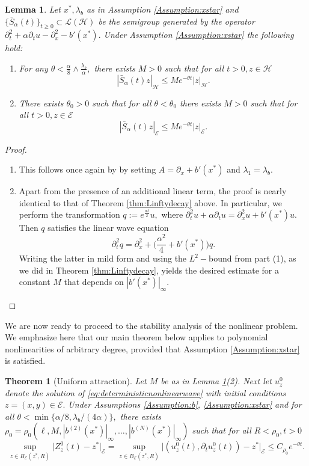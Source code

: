 \documentclass[10pt, reqno]{amsart}
\newcommand{\h}{\mathcal{H}}
\newcommand{\e}{\mathcal{E}}
\newtheorem{lem}{Lemma}
\newtheorem{thm}{Theorem}
\theoremstyle{definition}
\numberwithin{lem}{section}
\numberwithin{cor}{section}
\numberwithin{prop}{section}
\numberwithin{thm}{section}
\numberwithin{dfn}{section}
\begin{document}
\begin{lem}\label{lem:linearizedsemigroup} Let $x^*, \lambda_b$ as in Assumption \ref{Assumption:xstar} and $\{\bar{S}_\alpha(t)\}_{t\geq 0}\subset \mathscr{L}(\h)$ be the semigroup generated by the operator $\partial_t^2+\alpha\partial_tu-\partial_x^2-b'(x^*).$ Under Assumption \ref{Assumption:xstar} the following hold:
\begin{enumerate}
    \item For any $\theta<\tfrac{\alpha}{8}\wedge\tfrac{\lambda_b}{\alpha},$ there exists $M>0$ such that for all $t>0, z\in\h$
$$ |\bar{S}_\alpha(t)z|_{\h}\leq Me^{-\theta t}|z|_{\h}.      $$
\item There exists $\theta_0>0$ such that for all $\theta<\theta_0$ there exists $M>0$  such that for all $t>0, z\in\e$
$$ |\bar{S}_\alpha(t)z|_{\e}\leq Me^{-\theta t}|z|_{\e}.      $$
\end{enumerate}    
\end{lem}

\begin{proof}\begin{enumerate}
    \item This follows once again by \cite[Chapter IV, Proposition 1.2]{temam2012infinite} by setting $A=\partial_x+b'(x^*)$ and $\lambda_1=\lambda_b.$
    \item Apart from the presence of an additional linear term, the proof is nearly identical to that of Theorem \ref{thm:Linftydecay} above. In particular, we perform the transformation $q := e^{\frac{\alpha t}{2}}u,$ where $\partial_t^2u+\alpha\partial_tu=\partial_x^2u+b'(x^*)u.$ Then $q$ satisfies the linear wave equation
       \begin{equation*}
	\partial_t^2q = \partial_x^2 + \bigg(\frac{\alpha^2}{4}+b'(x^*)\bigg)q.
\end{equation*}
Writing the latter in mild form and using the $L^2-$bound from part (1), as we did in Theorem \ref{thm:Linftydecay}, yields the desired estimate for a constant $M$ that depends on $|b'(x^*)|_{\infty}.$\end{enumerate}   \end{proof}
We are now ready to proceed to the stability analysis of the nonlinear problem. We emphasize here that our main theorem below applies to polynomial nonlinearities of arbitrary degree, provided that Assumption \ref{Assumption:xstar} is satisfied.
\begin{thm}[Uniform attraction]\label{thm:domainofattraction} Let $M$ be as in Lemma \ref{lem:linearizedsemigroup}(2). Next let $u^0_z$ denote the solution of \eqref{eq:deterministicnonlinearwave} with initial conditions $z=(x,y)\in \e.$ Under Assumptions \ref{Assumption:b}, \ref{Assumption:xstar} and for all $\theta< \min \{\alpha/8, \lambda_b/(4\alpha)\},$ there exists $\rho_0=\rho_0(\ell, M, |b^{(2)}(x^*)|_{\infty},\dots, |b^{(N)}(x^*)|_{\infty})$ such that for all $R<\rho_0, t>0$
 \begin{equation}\label{eq:Nonlinearstabilitybound}
   \sup_{z\in B_{\e}(z^*, R)}\big|Z_z^0(t)-z^*\big|_{\e}=  \sup_{z\in B_{\e}(z^*, R)}\big|(u^0_{z}(t), \partial_tu^0_{z}(t))-z^*\big|_{\e}\leq C_{\rho_0}e^{-\theta t}.
 \end{equation}    
\end{thm}
\end{document}
